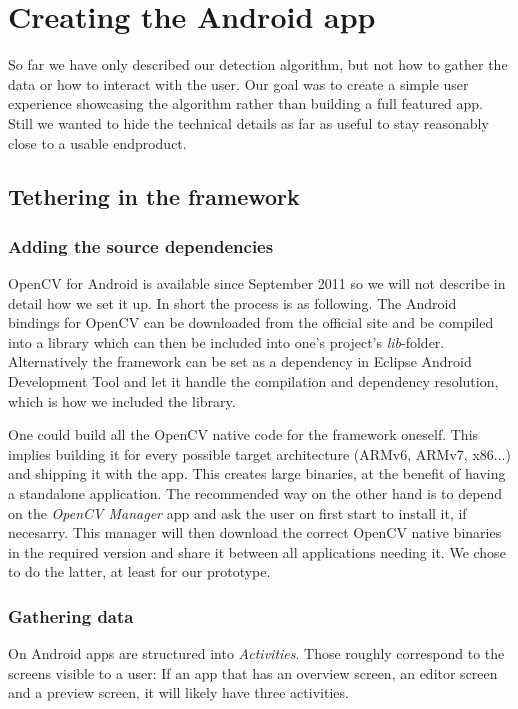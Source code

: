 
\chapter{Creating the Android app}
\label{android}
	So far we have only described our detection algorithm, but not how to gather the data or how to interact with the user. Our goal was to create a simple user experience showcasing the algorithm rather than building a full featured app. Still we wanted to hide the technical details as far as useful to stay reasonably close to a usable endproduct.

	\section{Tethering in the framework}
	\label{android-framework}
	\subsection{Adding the source dependencies}
	\label{android-framework-dependencies}
	OpenCV for Android is available since September 2011 so we will not describe in detail how we set it up. In short the process is as following. The Android bindings for OpenCV can be downloaded from the official site and be compiled into a library which can then be included into one's project's \textit{lib}-folder. Alternatively the framework can be set as a dependency in Eclipse Android Development Tool and let it handle the compilation and dependency resolution, which is how we included the library.

	One could build all the OpenCV native code for the framework oneself. This implies building it for every possible target architecture (ARMv6, ARMv7, x86...) and shipping it with the app. This creates large binaries, at the benefit of having a standalone application. The recommended way on the other hand is to depend on the \textit{OpenCV Manager} app and ask the user on first start to install it, if necesarry. This manager will then download the correct OpenCV native binaries in the required version and share it between all applications needing it. We chose to do the latter, at least for our prototype.

	\subsection{Gathering data}
	\label{android-framework-gathering}
	On Android apps are structured into \textit{Activities}. Those roughly correspond to the screens visible to a user: If an app that has an overview screen, an editor screen and a preview screen, it will likely have three activities.


